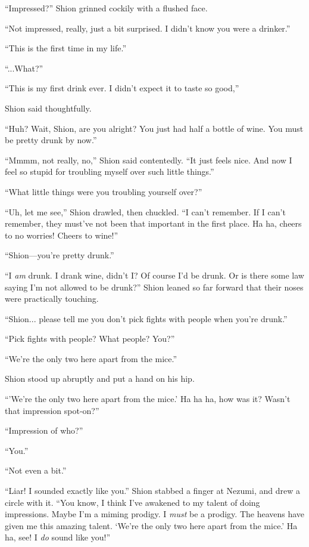 ``Impressed?'' Shion grinned cockily with a flushed face.

``Not impressed, really, just a bit surprised. I didn't know you were a
drinker.''

``This is the first time in my life.''

``...What?''

``This is my first drink ever. I didn't expect it to taste so good,''~

Shion said thoughtfully.

``Huh? Wait, Shion, are you alright? You just had half a bottle of wine.
You must be pretty drunk by now.''

``Mmmm, not really, no,'' Shion said contentedly. ``It just feels nice.
And now I feel so stupid for troubling myself over such little things.''

``What little things were you troubling yourself over?''

``Uh, let me see,'' Shion drawled, then chuckled. ``I can't remember. If
I can't remember, they must've not been that important in the first
place. Ha ha, cheers to no worries! Cheers to wine!''

``Shion---you're pretty drunk.''

``I \emph{am} drunk. I drank wine, didn't I? Of course I'd be drunk. Or is
there some law saying I'm not allowed to be drunk?'' Shion leaned so far
forward that their noses were practically touching.

``Shion... please tell me you don't pick fights with people when you're
drunk.''

``Pick fights with people? What people? You?''

``We're the only two here apart from the mice.''

Shion stood up abruptly and put a hand on his hip.

``'We're the only two here apart from the mice.' Ha ha ha, how was it?
Wasn't that impression spot-on?''

``Impression of who?''

``You.''

``Not even a bit.''

``Liar! I sounded exactly like you.'' Shion stabbed a finger at Nezumi,
and drew a circle with it. ``You know, I think I've awakened to my
talent of doing impressions. Maybe I'm a miming prodigy. I \emph{must} be a
prodigy. The heavens have given me this amazing talent. `We're the only
two here apart from the mice.' Ha ha, see! I \emph{do} sound like you!''

